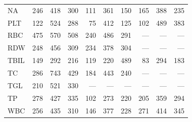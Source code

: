 \begin{table}[ht]
\begin{tabular}{lrrrrrrrrr}
NA & 246 & 418 & 300 & 111 & 361 & 150 & 165 & 388 & 235 \\
PLT & 122 & 524 & 288 & 75 & 412 & 125 & 102 & 489 & 383 \\
RBC & 475 & 570 & 508 & 240 & 486 & 291 & --- & --- & --- \\
RDW & 248 & 456 & 309 & 234 & 378 & 304 & --- & --- & --- \\
TBIL & 149 & 292 & 216 & 119 & 220 & 489 & 83 & 294 & 183 \\
TC & 286 & 743 & 429 & 184 & 443 & 240 & --- & --- & --- \\
TGL & 210 & 521 & 330 & --- & --- & --- & --- & --- & --- \\
TP & 278 & 427 & 335 & 102 & 273 & 220 & 205 & 359 & 294 \\
WBC & 256 & 435 & 310 & 146 & 377 & 228 & 271 & 414 & 345 \\
\bottomrule
\end{tabular}
\label{tab:07_prevalence_interpretable}
\end{table}